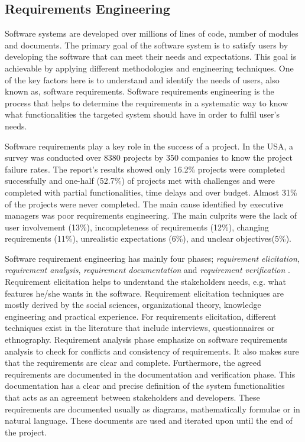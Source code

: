 \subsection{Requirements Engineering}

Software systems are developed over millions of lines of code, number of modules
and documents. The primary goal of the software system is to satisfy users by
developing the software that can meet their needs and expectations. This goal is
achievable by applying different methodologies and engineering techniques. One
of the key factors here is to understand and identify the needs of users, also
known as, software requirements. Software requirements engineering is the
process that helps to determine the requirements in a systematic way to know what
functionalities the targeted system should have in order to fulfil user's needs.\par
Software requirements play a key role in the success of a project. In the USA, a
survey was conducted over 8380 projects by 350 companies to know the project
failure rates. The report's results \cite{StandishReport} showed only 16.2\%
projects were completed successfully and one-half (52.7\%) of projects met with challenges and
were completed with partial functionalities, time delays and over budget. Almost
31\% of the projects were never completed. The main cause identified by
executive managers was poor requirements engineering. The main culprits were the lack of
user involvement (13\%), incompleteness of requirements (12\%), changing
requirements (11\%), unrealistic expectations (6\%), and unclear objectives(5\%). 

Software requirement engineering has mainly four phases; \emph{requirement
elicitation}, \emph{requirement analysis}, \emph{requirement documentation} and
\emph{requirement verification} \cite {Kotonya:1998}. Requirement elicitation
\cite{Coughlan:2002, Zowghi2005} helps to understand the
stakeholders needs, e.g. what features he/she wants in the software.
Requirement elicitation techniques are mostly derived by the social sciences,
organizational theory, knowledge engineering and practical experience. For
requirements elicitation, different techniques exist in the literature that
include interviews, questionnaires or ethnography.
Requirement analysis \cite{Nuseibeh:2000} phase emphasize on software requirements analysis 
to check for conflicts and consistency of requirements. It also makes sure
that the requirements are clear and complete.
Furthermore, the agreed requirements are documented in the documentation and verification phase. This documentation has a clear and precise definition of the system functionalities that acts as an agreement between
stakeholders and developers. These requirements are documented usually as diagrams, mathematically
formulae or in natural language. These documents are used and iterated upon
until the end of the project.

